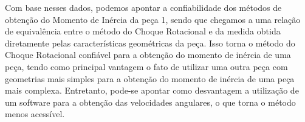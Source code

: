 Com base nesses dados, podemos apontar a confiabilidade dos métodos de obtenção do Momento de Inércia da peça 1, sendo que chegamos a uma relação de equivalência entre o método do Choque Rotacional e da medida obtida diretamente pelas características geométricas da peça. Isso torna o método do Choque Rotacional confiável para a obtenção do momento de inércia de uma peça, tendo como principal vantagem o fato de utilizar uma outra peça com geometrias mais simples para a obtenção do momento de inércia de uma peça mais complexa. Entretanto, pode-se apontar como desvantagem a utilização de um software para a obtenção das velocidades angulares, o que torna o método menos acessível. 